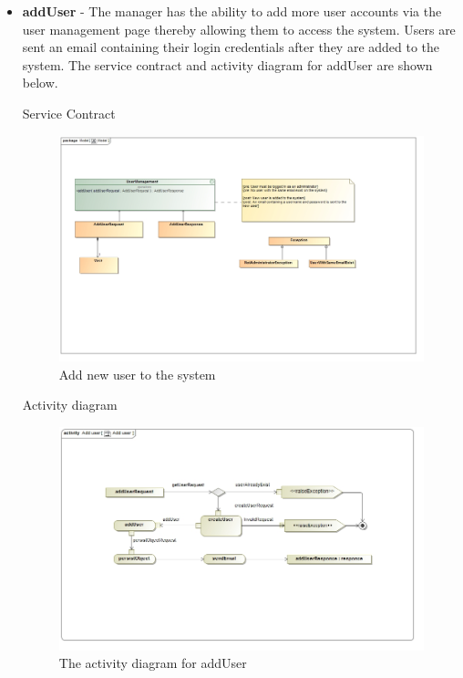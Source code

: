 \documentclass[english]{article}
\begin{document}
		\begin{itemize}

	  		\item \textbf{addUser} - The manager has the ability to add more user accounts via the user management page thereby allowing them to access the system. Users are sent an email containing their login credentials after they are added to the system. The service contract and activity diagram for addUser are shown below.
	  		\newpage
	  		

				\begin{center}
	  			Service Contract
	  		    \end{center}
	  		    
	  			\begin{figure}[H]
	  				\begin{center}
	  					\includegraphics[scale=0.25]{AddUserContract.jpg}
	  				\end{center}
	  				\caption{Add new user to the system}
	  				
	  			\end{figure}
	  		
	  			
	  			\begin{center}
	  				Activity diagram
	  			\end{center}
	  			
	  			\begin{figure}[H]
	  				\begin{center}
	  					\includegraphics[scale=0.3]{addUser1.jpg}
	  				\end{center}
	  				\caption{The activity diagram for addUser}
	  				

\end{figure}
\end{itemize}
\end{document}
